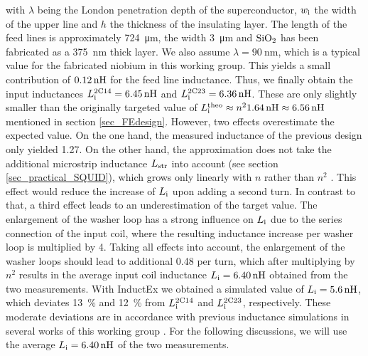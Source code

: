 with $\lambda$ being the London penetration depth of the superconductor, $w_{\rm i}$ the width of the upper line and $h$ the thickness of the insulating layer. The length of the feed lines is approximately \qty{724}{\um}, the width \qty{3}{\um} and $\rm{SiO_2}$ has been fabricated as a \qty{375}{\nm} thick layer. We also assume $\lambda=\qty{90}{\nm}$, which is a typical value for the fabricated niobium in this working group. This yields a small contribution of $\qty{0.12}{\nH}$ for the feed line inductance. Thus, we finally obtain the input inductances $L_{\rm i}^{\rm 2C14}=\qty{6.45}{\nH}$ and $L_{\rm i}^{\rm 2C23}=\qty{6.36}{\nH}$. 
These are only slightly smaller than the originally targeted value of $L_{\rm i}^{\rm theo}\approx n^{2}\qty{1.64}{\nH}\approx\qty{6.56}{\nH}$ mentioned in section \ref{sec_FEdesign}. However, two effects overestimate the expected value. On the one hand, the measured inductance of the previous design only yielded \qty{1.27}{\nH}. On the other hand, the approximation does not take the additional microstrip inductance $L_{\rm str}$ into account (see section \ref{sec_practical_SQUID}), which grows only linearly with $n$ rather than $n^2$ \cite{Ketchen1991}. This effect would reduce the increase of $L_{\rm i}$ upon adding a second turn.
In contrast to that, a third effect leads to an underestimation of the target value. The enlargement of the washer loop has a strong influence on $L_{\rm i}$ due to the series connection of the input coil, where the resulting inductance increase per washer loop is multiplied by 4. 
Taking all effects into account, the enlargement of the washer loops should lead to additional \qty{0.48}{\nH} per turn, which after multiplying by $n^2$ results in the average input coil inductance $L_{\rm i}=\qty{6.40}{\nH}$ obtained from the two measurements. With InductEx we obtained a simulated value of $L_{\rm i}=\qty{5.6}{\nH}$, which deviates \qty{13}{\percent} and \qty{12}{\percent} from $L_{\rm i}^{\rm 2C14}$ and $L_{\rm i}^{\rm 2C23}$, respectively. These moderate deviations are in accordance with previous inductance simulations in several works of this working group \cite{Ferring2015, Bauer2022}. For the following discussions, we will use the average $L_{\rm i}=\qty{6.40}{\nH}$ of the two measurements.

